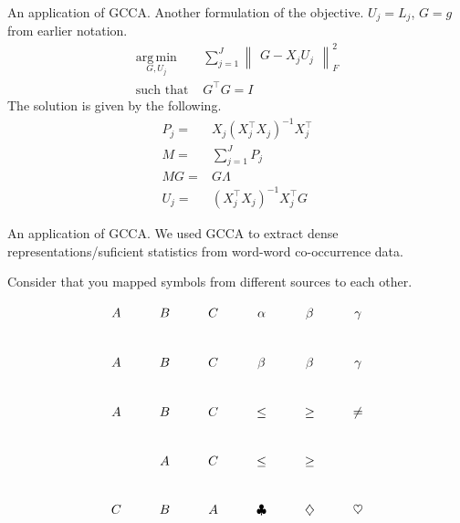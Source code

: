 \documentclass[compress]{beamer}
\begin{document}
\begin{frame}{An application of GCCA.}
  Another formulation of the objective. $U_j = L_j$, $G = g$ from
  earlier notation.
  \begin{equation}
  \label{eq:gcca}
\begin{split}
  \operatorname*{\arg\,\min}_{G,U_j} & \sum_{j=1}^J \begin{Vmatrix} G - X_jU_j \end{Vmatrix}^2_F \\
  \text{such that } & G^\top G = I
\end{split}
\end{equation}
The solution is given by the following.
\begin{align}
P_j =& X_j(X_j^\top X_j)^{-1}X_j^\top \label{eq:pp}\\
M =& \sum_{j=1}^J P_j \label{eq:mm}\\
M G =& G \Lambda\\
U_j =& \left(X_j^\top X_j\right)^{-1} X_j^\top G
\end{align}
\end{frame}

\begin{frame}{An application of GCCA.}
  We used GCCA to extract dense representations/suficient statistics
  from word-word co-occurrence data.

  Consider that you mapped symbols from different sources to each other.
  
  \begin{displaymath}
    \xymatrix{
      A   & B   &  C  & \alpha & \beta & \gamma \\
      A   & B   &  C  & \beta & \beta & \gamma \\
      A   & B   &  C  & \le     &    \ge &   \neq   \\
          & A   &  C  & \le     &    \ge & \\ 
      C   & B   &  A  & \clubsuit & \diamondsuit & \heartsuit
    }
  \end{displaymath}
\end{frame}
\end{document}
